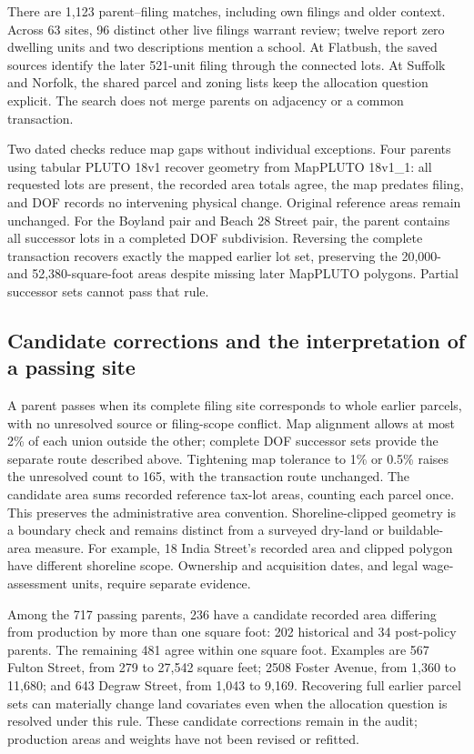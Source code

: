 There are 1,123 parent--filing matches, including own filings and older context.
Across 63 sites, 96 distinct other live filings warrant review; twelve report
zero dwelling units and two descriptions mention a school. At Flatbush, the
saved sources identify the later 521-unit filing through the connected lots.
At Suffolk and Norfolk, the shared parcel and zoning lists keep the allocation
question explicit. The search does not merge parents on adjacency or a common
transaction.

Two dated checks reduce map gaps without individual exceptions. Four parents
using tabular PLUTO 18v1 recover geometry from MapPLUTO 18v1\_1: all requested
lots are present, the recorded area totals agree, the map predates filing,
and DOF records no intervening physical change. Original reference areas remain
unchanged. For the Boyland pair and Beach 28 Street pair, the parent contains
all successor lots in a completed DOF subdivision. Reversing the complete
transaction recovers exactly the mapped earlier lot set, preserving the
20,000- and 52,380-square-foot areas despite missing later MapPLUTO polygons.
Partial successor sets cannot pass that rule.

\clearpage
\subsection*{Candidate corrections and the interpretation of a passing site}

A parent passes when its complete filing site corresponds to whole earlier
parcels, with no unresolved source or filing-scope conflict. Map alignment
allows at most 2\% of each union outside the other; complete DOF successor
sets provide the separate route described above. Tightening map tolerance to
1\% or 0.5\% raises the unresolved count to 165, with the transaction route
unchanged. The candidate area sums
recorded reference tax-lot areas, counting each parcel once. This preserves
the administrative area convention. Shoreline-clipped geometry is a boundary
check and remains distinct from a surveyed dry-land or buildable-area measure.
For example, 18 India Street's recorded area and clipped polygon have different
shoreline scope. Ownership and acquisition dates, and legal wage-assessment
units, require separate evidence.

Among the 717 passing parents, 236 have a candidate recorded area differing
from production by more than one square foot: 202 historical and 34
post-policy parents. The remaining 481 agree within one square foot.
Examples are 567 Fulton Street, from 279 to 27,542 square feet; 2508 Foster
Avenue, from 1,360 to 11,680; and 643 Degraw Street, from 1,043 to 9,169.
Recovering full earlier parcel sets can materially change land covariates even
when the allocation question is resolved under this rule. These candidate
corrections remain in the audit; production areas and weights have not been
revised or refitted.

